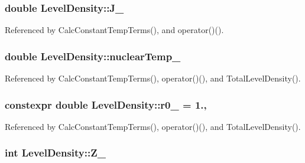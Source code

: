 \hypertarget{classLevelDensity_a20733f689cc018869ef19f2e6bcd3c87}{
\subsubsection[{J\-\_\-}]{\setlength{\rightskip}{0pt plus 5cm}double Level\-Density\-::\-J\-\_\-\hspace{0.3cm}{\ttfamily [protected]}}}\label{classLevelDensity_a20733f689cc018869ef19f2e6bcd3c87}


Referenced by Calc\-Constant\-Temp\-Terms(), and operator()().

\hypertarget{classLevelDensity_a7a97d015ef2f00caa58af1854ee492ca}{
\subsubsection[{nuclear\-Temp\-\_\-}]{\setlength{\rightskip}{0pt plus 5cm}double Level\-Density\-::nuclear\-Temp\-\_\-\hspace{0.3cm}{\ttfamily [protected]}}}\label{classLevelDensity_a7a97d015ef2f00caa58af1854ee492ca}


Referenced by Calc\-Constant\-Temp\-Terms(), operator()(), and Total\-Level\-Density().

\hypertarget{classLevelDensity_a5ec748a62bd8277973d373a8b52292d7}{
\subsubsection[{r0\-\_\-}]{\setlength{\rightskip}{0pt plus 5cm}constexpr double Level\-Density\-::r0\-\_\- = 1.\hspace{0.3cm}{\ttfamily [static]}, {\ttfamily [protected]}}}\label{classLevelDensity_a5ec748a62bd8277973d373a8b52292d7}


Referenced by Calc\-Constant\-Temp\-Terms(), operator()(), and Total\-Level\-Density().

\hypertarget{classLevelDensity_a4e3c2f3637a11130dc5d0504bf0af9c9}{
\subsubsection[{Z\-\_\-}]{\setlength{\rightskip}{0pt plus 5cm}int Level\-Density\-::\-Z\-\_\-\hspace{0.3cm}{\ttfamily [protected]}}}\label{classLevelDensity_a4e3c2f3637a11130dc5d0504bf0af9c9}


